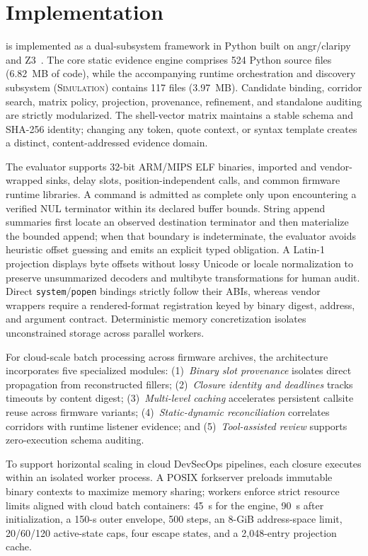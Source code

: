 \section{Implementation}
\label{sec:implementation}

\tool is implemented as a dual-subsystem framework in Python built on angr/claripy~\cite{angr2016} and Z3~\cite{z3solver2008}. The core static evidence engine comprises 524 Python source files (6.82~MB of code), while the accompanying runtime orchestration and discovery subsystem (\textsc{Simulation}) contains 117 files (3.97~MB). Candidate binding, corridor search, matrix policy, projection, provenance, refinement, and standalone auditing are strictly modularized. The shell-vector matrix maintains a stable schema and SHA-256 identity; changing any token, quote context, or syntax template creates a distinct, content-addressed evidence domain.

The evaluator supports 32-bit ARM/MIPS ELF binaries, imported and vendor-wrapped sinks, delay slots, position-independent calls, and common firmware runtime libraries. A command is admitted as complete only upon encountering a verified NUL terminator within its declared buffer bounds. String append summaries first locate an observed destination terminator and then materialize the bounded append; when that boundary is indeterminate, the evaluator avoids heuristic offset guessing and emits an explicit typed obligation. A Latin-1 projection displays byte offsets without lossy Unicode or locale normalization to preserve unsummarized decoders and multibyte transformations for human audit. Direct \texttt{system}/\texttt{popen} bindings strictly follow their ABIs, whereas vendor wrappers require a rendered-format registration keyed by binary digest, address, and argument contract. Deterministic memory concretization isolates unconstrained storage across parallel workers.

For cloud-scale batch processing across firmware archives, the architecture incorporates five specialized modules: (1)~\emph{Binary slot provenance} isolates direct propagation from reconstructed fillers; (2)~\emph{Closure identity and deadlines} tracks timeouts by content digest; (3)~\emph{Multi-level caching} accelerates persistent callsite reuse across firmware variants; (4)~\emph{Static-dynamic reconciliation} correlates corridors with runtime listener evidence; and (5)~\emph{Tool-assisted review} supports zero-execution schema auditing.

To support horizontal scaling in cloud DevSecOps pipelines, each closure executes within an isolated worker process. A POSIX forkserver preloads immutable binary contexts to maximize memory sharing; workers enforce strict resource limits aligned with cloud batch containers: 45~s for the engine, 90~s after initialization, a 150-s outer envelope, 500 steps, an 8-GiB address-space limit, 20/60/120 active-state caps, four escape states, and a 2,048-entry projection cache.

